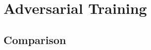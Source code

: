 \section{Adversarial Training}
\label{adv_training}












\subsection{Comparison}
\label{adv_comparison}
